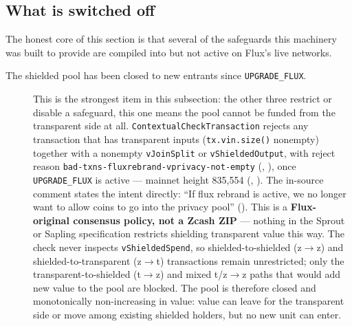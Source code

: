 \subsection{What is switched off}
\label{sec:switched-off}

The honest core of this section is that several of the safeguards this machinery was built to
provide are compiled into \fluxd but not active on Flux's live networks.

\begin{description}
\item[The shielded pool has been closed to new entrants since \texttt{UPGRADE\_FLUX}.] This is the
  strongest item in this subsection: the other three restrict or disable a safeguard, this one means
  the pool cannot be funded from the transparent side at all. \texttt{Contextual\allowbreak{}Check\allowbreak{}Transaction}
  rejects any transaction that has transparent inputs (\texttt{tx.vin.size()} nonempty) together with
  a nonempty \texttt{vJoinSplit} or \texttt{v\allowbreak{}Shielded\allowbreak{}Output}, with reject reason
  \texttt{bad-\allowbreak{}txns-\allowbreak{}fluxrebrand-\allowbreak{}vprivacy-\allowbreak{}not-\allowbreak{}empty} (\shipped, ),
  once \texttt{UPGRADE\_FLUX} is active — mainnet height 835{,}554 (\shipped,
  ). The in-source comment states the intent directly:
  ``If flux rebrand is active, we no longer want to allow coins to go into the privacy pool''
  (). This is a \textbf{Flux-original consensus policy, not a
  Zcash ZIP} — nothing in the Sprout or Sapling specification restricts shielding transparent value
  this way. The check never inspects \texttt{vShieldedSpend}, so shielded-to-shielded (z$\to$z) and
  shielded-to-transparent (z$\to$t) transactions remain unrestricted; only the transparent-to-shielded
  (t$\to$z) and mixed t/z$\to$z paths that would add new value to the pool are blocked. The pool is
  therefore closed and monotonically non-increasing in value: value can leave for
  the transparent side or move among existing shielded holders, but no new unit can enter.


\end{description}
